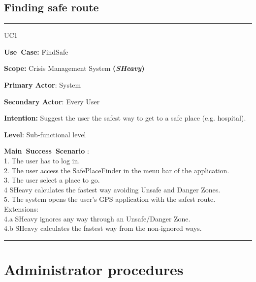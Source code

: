 \subsection{Finding safe route}
\vspace{0.5cm}
\hrule
\vspace{0.5cm}
\begin{lyxlist}{UC1}
\small{
\item [\textbf{Use~Case:}] FindSafe
\item [\textbf{Scope:}] Crisis Management System \textbf{(\emph{SHeavy})}
\item [\textbf{Primary Actor}:] System
\item [\textbf{Secondary Actor}:] Every User
\item [\textbf{Intention:}]Suggest the user the safest way to get to a safe
place (e.g. hospital).
\item [\textbf{Level}:]Sub-functional level
\item [\textbf{Main~Success~Scenario}]:\\
1. The user has to log in.\\
2. The user access the SafePlaceFinder in the menu bar of the application.\\
3. The user select a place to go.\\
4  SHeavy calculates the fastest way avoiding Unsafe and Danger Zones.\\
5. The system opens the user's GPS application with the safest route.\\
Extensions:\\
	4.a SHeavy ignores any way through an Unsafe/Danger Zone.\\
	4.b SHeavy calculates the fastest way from the non-ignored ways.\\ 
\item 
}
\end{lyxlist}
\hrule
\vspace{0.5cm}

\section{Administrator procedures}

